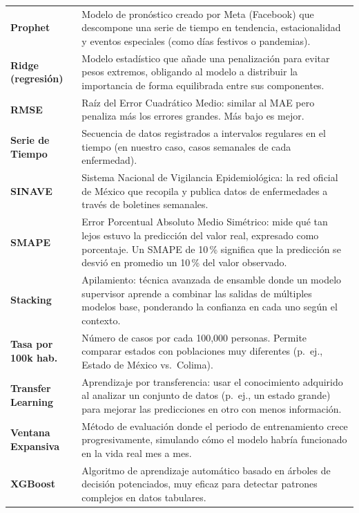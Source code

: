 \documentclass[12pt, letterpaper]{article}
\begin{document}
\begin{longtable}{>{\bfseries\small}p{3.8cm} p{11.5cm}}
\addlinespace
Prophet & Modelo de pronóstico creado por Meta (Facebook) que descompone una serie de tiempo en tendencia, estacionalidad y eventos especiales (como días festivos o pandemias). \\
\addlinespace
Ridge (regresión) & Modelo estadístico que añade una penalización para evitar pesos extremos, obligando al modelo a distribuir la importancia de forma equilibrada entre sus componentes. \\
\addlinespace
RMSE & Raíz del Error Cuadrático Medio: similar al MAE pero penaliza más los errores grandes. Más bajo es mejor. \\
\addlinespace
Serie de Tiempo & Secuencia de datos registrados a intervalos regulares en el tiempo (en nuestro caso, casos semanales de cada enfermedad). \\
\addlinespace
SINAVE & Sistema Nacional de Vigilancia Epidemiológica: la red oficial de México que recopila y publica datos de enfermedades a través de boletines semanales. \\
\addlinespace
SMAPE & Error Porcentual Absoluto Medio Simétrico: mide qué tan lejos estuvo la predicción del valor real, expresado como porcentaje. Un SMAPE de 10\,\% significa que la predicción se desvió en promedio un 10\,\% del valor observado. \\
\addlinespace
Stacking & Apilamiento: técnica avanzada de ensamble donde un modelo supervisor aprende a combinar las salidas de múltiples modelos base, ponderando la confianza en cada uno según el contexto. \\
\addlinespace
Tasa por 100k hab. & Número de casos por cada 100,000 personas. Permite comparar estados con poblaciones muy diferentes (p.~ej., Estado de México vs.\ Colima). \\
\addlinespace
Transfer Learning & Aprendizaje por transferencia: usar el conocimiento adquirido al analizar un conjunto de datos (p.~ej., un estado grande) para mejorar las predicciones en otro con menos información. \\
\addlinespace
Ventana Expansiva & Método de evaluación donde el periodo de entrenamiento crece progresivamente, simulando cómo el modelo habría funcionado en la vida real mes a mes. \\
\addlinespace
XGBoost & Algoritmo de aprendizaje automático basado en árboles de decisión potenciados, muy eficaz para detectar patrones complejos en datos tabulares. \\
\end{longtable}
\end{document}
